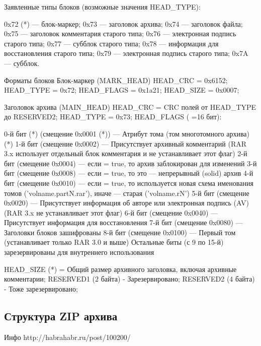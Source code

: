 Заявленные типы блоков (возможные значения HEAD_TYPE):             
            
0x72 (*) — блок-маркер;
0x73 — заголовок архива;
0x74 — заголовок файла;
0x75 — заголовок комментария старого типа;
0x76 — электронная подпись старого типа;
0x77 — субблок старого типа;
0x78 — информация для восстановления старого типа;
0x79 — электронная подпись старого типа;
0x7A — субблок.
            
Форматы блоков
Блок-маркер (MARK_HEAD)
HEAD_CRC = 0x6152;
HEAD_TYPE = 0x72;
HEAD_FLAGS = 0x1a21;
HEAD_SIZE = 0x0007;
            
Заголовок архива (MAIN_HEAD)
HEAD_CRC = CRC полей от HEAD_TYPE до RESERVED2;
HEAD_TYPE = 0x73;
HEAD_FLAGS ( =16 бит):                     

0-й бит (*) (смещение 0x0001 (*)) — Атрибут тома (том многотомного архива) (*)
1-й бит (смещение 0x0002) — Присутствует архивный комментарий (RAR 3.x использует отдельный блок комментария и не устанавливает этот флаг)
2-й бит (смещение 0x0004) — если = true, то архив заблокирован для изменений
3-й бит (смещение 0x0008) — если = true, то это — непрерывный (solid) архив
4-й бит (смещение 0x0010) — если = true, то используется новая схема именования томов ('volname.partN.rar'), иначе — старая ('volname.rN')
5-й бит (смещение 0x0020) — Присутствует информация об авторе или электронная подпись (AV) (RAR 3.x не устанавливает этот флаг)
6-й бит (смещение 0x0040) — Присутствует информация для восстановления
7-й бит (смещение 0x0080) — Заголовки блоков зашифрованы
8-й бит (смещение 0x0100) — Первый том (устанавливает только RAR 3.0 и выше)
Остальные биты (с 9 по 15-й) зарезервированы для внутреннего использования

HEAD_SIZE (*) = Общий размер архивного заголовка, включая архивные комментарии;
RESERVED1 (2 байта) - Зарезервировано;
RESERVED2 (4 байта) - Тоже зарезервировано;
    
\subsection{Структура ZIP архива}                
Инфо http://habrahabr.ru/post/100200/

